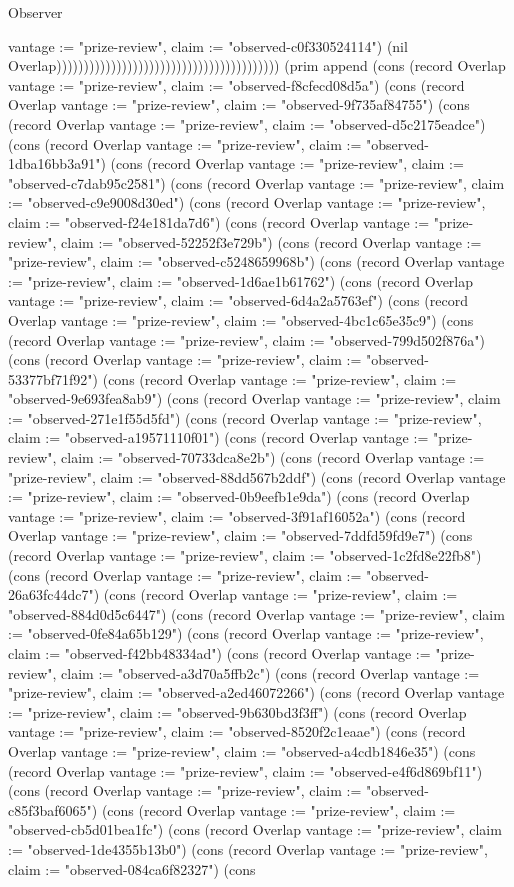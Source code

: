 \begin{lexlean}{Observer}
\begin{semanticmodule}
{{vantage := "prize-review", claim := "observed-c0f330524114"}) (nil Overlap))))))))))))))))))))))))))))))))))))))))) (prim append (cons (record Overlap {vantage := "prize-review", claim := "observed-f8cfecd08d5a"}) (cons (record Overlap {vantage := "prize-review", claim := "observed-9f735af84755"}) (cons (record Overlap {vantage := "prize-review", claim := "observed-d5c2175eadce"}) (cons (record Overlap {vantage := "prize-review", claim := "observed-1dba16bb3a91"}) (cons (record Overlap {vantage := "prize-review", claim := "observed-c7dab95c2581"}) (cons (record Overlap {vantage := "prize-review", claim := "observed-c9e9008d30ed"}) (cons (record Overlap {vantage := "prize-review", claim := "observed-f24e181da7d6"}) (cons (record Overlap {vantage := "prize-review", claim := "observed-52252f3e729b"}) (cons (record Overlap {vantage := "prize-review", claim := "observed-c5248659968b"}) (cons (record Overlap {vantage := "prize-review", claim := "observed-1d6ae1b61762"}) (cons (record Overlap {vantage := "prize-review", claim := "observed-6d4a2a5763ef"}) (cons (record Overlap {vantage := "prize-review", claim := "observed-4bc1c65e35c9"}) (cons (record Overlap {vantage := "prize-review", claim := "observed-799d502f876a"}) (cons (record Overlap {vantage := "prize-review", claim := "observed-53377bf71f92"}) (cons (record Overlap {vantage := "prize-review", claim := "observed-9e693fea8ab9"}) (cons (record Overlap {vantage := "prize-review", claim := "observed-271e1f55d5fd"}) (cons (record Overlap {vantage := "prize-review", claim := "observed-a19571110f01"}) (cons (record Overlap {vantage := "prize-review", claim := "observed-70733dca8e2b"}) (cons (record Overlap {vantage := "prize-review", claim := "observed-88dd567b2ddf"}) (cons (record Overlap {vantage := "prize-review", claim := "observed-0b9eefb1e9da"}) (cons (record Overlap {vantage := "prize-review", claim := "observed-3f91af16052a"}) (cons (record Overlap {vantage := "prize-review", claim := "observed-7ddfd59fd9e7"}) (cons (record Overlap {vantage := "prize-review", claim := "observed-1c2fd8e22fb8"}) (cons (record Overlap {vantage := "prize-review", claim := "observed-26a63fc44dc7"}) (cons (record Overlap {vantage := "prize-review", claim := "observed-884d0d5c6447"}) (cons (record Overlap {vantage := "prize-review", claim := "observed-0fe84a65b129"}) (cons (record Overlap {vantage := "prize-review", claim := "observed-f42bb48334ad"}) (cons (record Overlap {vantage := "prize-review", claim := "observed-a3d70a5ffb2c"}) (cons (record Overlap {vantage := "prize-review", claim := "observed-a2ed46072266"}) (cons (record Overlap {vantage := "prize-review", claim := "observed-9b630bd3f3ff"}) (cons (record Overlap {vantage := "prize-review", claim := "observed-8520f2c1eaae"}) (cons (record Overlap {vantage := "prize-review", claim := "observed-a4cdb1846e35"}) (cons (record Overlap {vantage := "prize-review", claim := "observed-e4f6d869bf11"}) (cons (record Overlap {vantage := "prize-review", claim := "observed-c85f3baf6065"}) (cons (record Overlap {vantage := "prize-review", claim := "observed-cb5d01bea1fc"}) (cons (record Overlap {vantage := "prize-review", claim := "observed-1de4355b13b0"}) (cons (record Overlap {vantage := "prize-review", claim := "observed-084ca6f82327"}) (cons }
\end{semanticmodule}
\end{lexlean}
